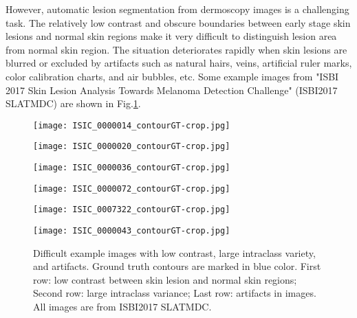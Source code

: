\documentclass{article}
\begin{document}
However, automatic lesion segmentation from dermoscopy images is a challenging task. The relatively low contrast and obscure boundaries between early stage skin lesions and normal skin regions make it very difficult to distinguish lesion area from normal skin region. The situation deteriorates rapidly when skin lesions are blurred or excluded by artifacts such as natural hairs, veins, artificial ruler marks, color calibration charts, and air bubbles, etc. Some example images from  
"ISBI 2017 Skin Lesion Analysis Towards Melanoma Detection Challenge" (ISBI2017 SLATMDC)\cite{2017-ISBI-SkinLesionChallenge} are shown in Fig.\ref{fig:example-artifacts}.

\begin{figure}[htb]

\begin{minipage}[b]{.48\linewidth}
  \centering
  \centerline{\texttt{[image: ISIC\_0000014\_contourGT-crop.jpg]}}
\end{minipage}
\begin{minipage}[b]{.48\linewidth}
  \centering
  \centerline{\texttt{[image: ISIC\_0000020\_contourGT-crop.jpg]}}
\end{minipage}
\hfill
\begin{minipage}[b]{0.48\linewidth}
  \centering
  \centerline{\texttt{[image: ISIC\_0000036\_contourGT-crop.jpg]}}
\end{minipage}
\begin{minipage}[b]{0.48\linewidth}
  \centering
  \centerline{\texttt{[image: ISIC\_0000072\_contourGT-crop.jpg]}}
\end{minipage}
\begin{minipage}[b]{0.48\linewidth}
  \centering
  \centerline{\texttt{[image: ISIC\_0007322\_contourGT-crop.jpg]}}
\end{minipage}
\hfill
\begin{minipage}[b]{0.48\linewidth}
  \centering
  \centerline{\texttt{[image: ISIC\_0000043\_contourGT-crop.jpg]}}
\end{minipage} 
\caption{Difficult example images with low contrast, large intraclass variety, and artifacts. Ground truth contours are marked in blue color. First row: low contrast between skin lesion and normal skin regions; Second row: large intraclass variance; Last row: artifacts in images. All images are from ISBI2017 SLATMDC\cite{2017-ISBI-SkinLesionChallenge}.}
\label{fig:example-artifacts}
\end{figure}
\end{document}
